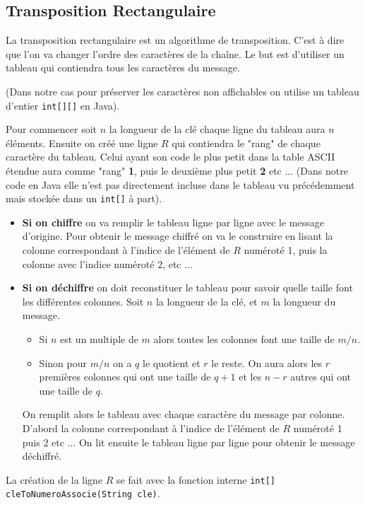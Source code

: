 \documentclass{article}
\begin{document}
\subsection{Transposition Rectangulaire}\label{sub:transpo}

La transposition rectangulaire est un algorithme de transposition. C'est à dire que l'on va changer l'ordre des caractères de la chaîne. Le but est d'utiliser un tableau qui contiendra tous les caractères du message.

(Dans notre cas pour préserver les caractères non affichables on utilise un tableau d'entier \verb+int[][]+ en Java). 


 Pour commencer soit $n$ la longueur de la clé chaque ligne du tableau aura $n$ éléments. Ensuite on créé une ligne $R$ qui contiendra le "rang" de chaque caractère du tableau. Celui ayant son code le plus petit dans la table ASCII étendue  aura comme "rang" \textbf{1}, puis le deuxième plus petit \textbf{2} etc ... (Dans notre code en Java elle n'est pas directement incluse dans le tableau vu précédemment mais stockée dans un \verb+int[]+ à part).
\begin{itemize}
\item \textbf{Si on chiffre} on va remplir le tableau ligne par ligne avec le message d'origine. Pour obtenir le message chiffré on va le construire en lisant la colonne correspondant à l'indice de l’élément de $R$ numéroté 1, puis la colonne avec l'indice numéroté 2, etc ...  
\item \textbf{Si on déchiffre} on doit reconstituer le tableau pour savoir quelle taille font les différentes colonnes. Soit $n$ la longueur de la clé, et $m$ la longueur du message. 
\begin{itemize}
\item Si $n$ est un multiple de $m$ alors toutes les colonnes font une taille de $m/n$.
\item Sinon pour $m/n$ on a $q$ le quotient et $r$ le reste. On aura alors les $r$ premières colonnes qui ont une taille de $q+1$ et les $n-r$ autres qui ont une taille de $q$.
\end{itemize}
On remplit alors le tableau avec chaque caractère du message par colonne. D'abord la colonne correspondant à l'indice de l'élément de $R$ numéroté 1 puis 2 etc ...
On lit ensuite le tableau ligne par ligne pour obtenir le message déchiffré.
\end{itemize}

La création de la ligne $R$ se fait avec la fonction interne \verb+int[] cleToNumeroAssocie(String cle)+.
\end{document}
